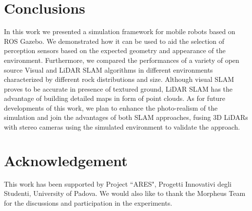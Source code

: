 \documentclass[conference]{IEEEtran}  %
\begin{document}
\section{Conclusions}\label{sec::conc}
In this work we presented a simulation framework for mobile robots based on ROS Gazebo. We demonstrated how it can be used to aid the selection of perception sensors based on the expected geometry and appearance of the environment. Furthermore, we compared the performances of a variety of open source Visual and LiDAR SLAM algorithms in different environments characterized by different rock distributions and size. Although visual SLAM proves to be accurate in presence of textured ground, LiDAR SLAM has the advantage of building detailed maps in form of point clouds. As for future developments of this work, we plan to enhance the photo-realism of the simulation and join the advantages of both SLAM approaches, fusing 3D LiDARs with stereo cameras using the simulated environment to validate the approach.

\section*{Acknowledgement}
This work has been supported by Project ``ARES", Progetti Innovativi degli Studenti, University of Padova. We would also like to thank the Morpheus Team for the discussions and participation in the experiments.



\end{document}
